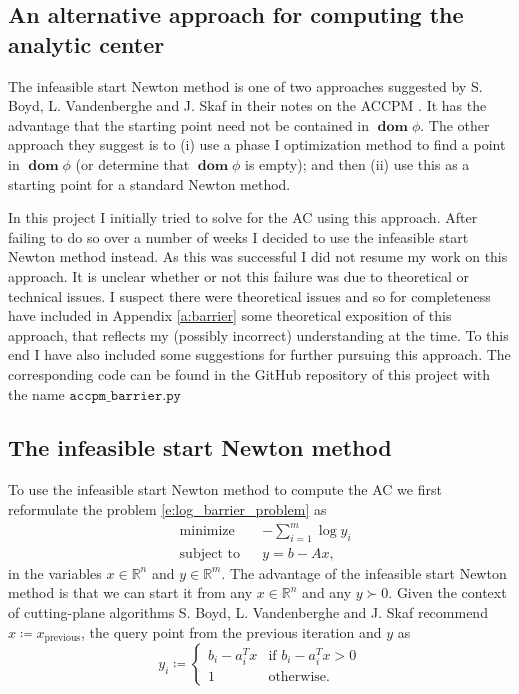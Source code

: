 \documentclass[11pt]{amsart}
\theoremstyle{definition}
\theoremstyle{remark}
\newcommand{\transpose}{T}
\DeclareMathOperator{\domain}{\textbf{dom}}
\begin{document}
    \subsection{An alternative approach for computing the analytic center}
        The infeasible start Newton method is one of two approaches suggested by S. Boyd, L. Vandenberghe and J. Skaf in their notes on the ACCPM \cite[p. 3]{BVS08}. It has the advantage that the starting point need not be contained in $\domain \phi$. The other approach they suggest is to (i) use a phase I optimization method \cite[Section 11.4]{BV04} to find a point in $\domain \phi$ (or determine that $\domain \phi$ is empty); and then (ii) use this as a starting point for a standard Newton method. 

        In this project I initially tried to solve for the AC using this approach. After failing to do so over a number of weeks I decided to use the infeasible start Newton method instead. As this was successful I did not resume my work on this approach. It is unclear whether or not this failure was due to theoretical or technical issues. I suspect there were theoretical issues and so for completeness have included in Appendix \ref{a:barrier} some theoretical exposition of this approach, that reflects
        my (possibly incorrect) understanding at the time. To this end I have also included some suggestions for further pursuing this approach. The corresponding code can be found in the GitHub repository of this project with the name $\texttt{accpm\_barrier.py}$ 

    \subsection{The infeasible start Newton method}\label{ss:infeasible} To use the infeasible start Newton method to compute the AC we first reformulate the problem \eqref{e:log_barrier_problem} as 
    \begin{equation}\label{e:log_barrier_problem_sub}
        \begin{aligned}
        & \text{minimize} && -\sum_{i=1}^m \log{y_i}  \\
        & \text{subject to} && y = b - Ax, 
        \end{aligned}
    \end{equation}
    in the variables $x \in \mathbb{R}^n$ and $y \in \mathbb{R}^m$. The advantage of the infeasible start Newton method is that we can start it from any $x \in \mathbb{R}^n$ and any $y \succ 0$. Given the context of cutting-plane algorithms S. Boyd, L. Vandenberghe and J. Skaf recommend $x \coloneqq x_\text{previous}$, the query point from the previous iteration and $y$ as 
    \begin{equation*}
        y_i \coloneqq
        \begin{cases} 
            b_i - a_i^\transpose x &\text{if $b_i - a_i^\transpose x > 0$}  \\
            1 &\text{otherwise.}
        \end{cases}     
    \end{equation*} 
\end{document}

